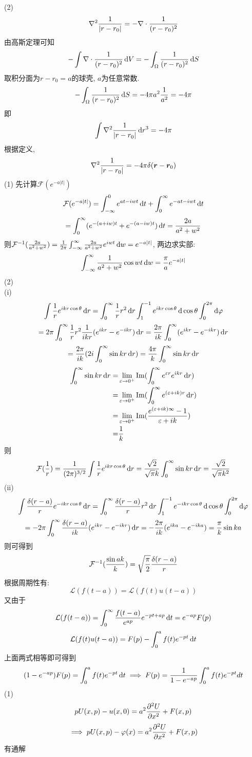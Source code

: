 \documentclass[UTF8,9pt]{ctexart}
\begin{document}
 \newpage
(2)\\
$$\laplace\ff{|r-r_0|} = -\div\ff{(r-r_0)^2}$$
由高斯定理可知
$$-\int \div\ff{(r-r_0)^2}\d V = - \int_\O \ff{(r-r_0)^2}\d S$$
取积分面为$r-r_0=a$的球壳, $a$为任意常数. 
$$- \int_\O \ff{(r-r_0)^2}\d S = -4\pi a^2\ff{a^2} = -4\pi$$
即
$$\int \laplace\ff{|r-r_0|} \d r^3 = -4\pi$$
根据定义, 
$$\laplace\ff{|r-r_0|} =  -4\pi\de(\bm{r}-\bm{r}_0)$$
\newpage
{}
(1)
先计算$\mathcal{F}(e^{-a|t|})$
$$\mathcal{F}(e^{-a|t|}) = \int_{-\infty}^{0} e^{at-iwt}\d t+\int^{\infty}_{0} e^{-at-iwt} \d t
 $$
$$=\int^{\infty}_{0} (e^{-(a+iw)t}+e^{-(a-iw)t})\d t = \f{2a}{a^2+w^2}$$
则$\mathcal{F}^{-1}(\f{2a}{a^2+w^2}) = \ff{2\pi}\int_{-\infty}^{\infty} \f{2a}{a^2+w^2}e^{iwt} \d w = e^{-a|t|}$, 两边求实部: 
$$\int_{-\infty}^{\infty} \f{1}{a^2+w^2}\cos wt \d w = \f{\pi}{a}e^{-a|t|}$$
\newpage
(2)\\
(i)
$$\int \ff{r}e^{ikr\cos\t} \d r= \int_0^{\infty}\ff{r}r^2\d r\int_1^{-1}e^{ikr\cos\t} \d\cos\t\int_0^{2\pi}\d\vp$$
$$=2\pi \int_0^{\infty}\ff{r}r^2\ff{ikr} (e^{ikr}-e^{-ikr})\d r = \f{2\pi}{ik}\int_0^\infty  (e^{ikr}-e^{-ikr})\d r$$
$$=\f{2\pi}{ik}(2i\int_0^\infty \sin kr\d r) = \f{4\pi}{k}\int_0^\infty \sin kr\d r$$
$$\ar{
    \dis\int_0^\infty \sin kr\d r =& \dis\lim_{\ep\rightarrow0^+}\Im(\int_0^\infty e^{\ep r}e^{ikr}\d r)\\
    =& \dis\lim_{\ep\rightarrow0^+}\Im(\int_0^\infty e^{(\ep+ik)r}\d r)\\
    =& \dis\lim_{\ep\rightarrow0^+}\Im(\f{e^{(\ep+ik)\infty}-1}{\ep+ik})\\
    =& \dis\ff{k}
}$$
则$$\mathcal{F}(\ff{r}) = \ff{(2\pi)^{3/2}}\int \ff{r}e^{ikr\cos\t} \d r = \f{\sqrt{2}}{\sqrt{\pi}k}\int_0^\infty \sin kr\d r = \f{\sqrt{2}}{\sqrt{\pi}k^2}$$
\newpage
(ii)
$$\int \f{\de(r-a)}{r}e^{-ikr\cos\t} \d r=\int_0^{\infty}\f{\de(r-a)}{r}r^2\d r\int_1^{-1}e^{-ikr\cos\t} \d\cos\t\int_0^{2\pi}\d\vp$$
$$=-2\pi \int_0^{\infty}\f{\de(r-a)}{ik} (e^{ikr}-e^{-ikr})\d r = -\f{2\pi}{ik}(e^{ika}-e^{-ika}) = \f{\pi}{k}\sin ka$$
则可得到
$$\mathcal{F}^{-1}(\f{\sin ak}{k}) = \sqrt{\frac{\pi}{2}} \frac{\delta(r-a)}{r}$$
\newpage
{}
根据周期性有: $$\mathcal{L}(f(t-a))=\mathcal{L}(f(t)u(t-a)) $$
又由于
$$\mathcal{L}(f(t-a)) = \int_0^\infty\f{f(t-a)}{e^{ap}}e^{-pt+ap}\d t = e^{-ap}F(p)$$
$$\mathcal{L}(f(t)u(t-a)) =F(p)-\int_0^a f(t)e^{-pt}\d t $$
上面两式相等即可得到
$$(1-e^{-ap})F(p)=\int_0^a f(t)e^{-pt}\d t \ip F(p)=\frac{1}{1-e^{-a p}} \int_{0}^{a} f(t) e^{-p t} d t$$
\newpage
{}
(1) 
$$pU(x,p)-u(x,0)=a^2\pp[2]{U}{x}+F(x,p)$$
$$\ip pU(x,p)-\vp(x)=a^2\pp[2]{U}{x}+F(x,p)$$
有通解
\end{document}
